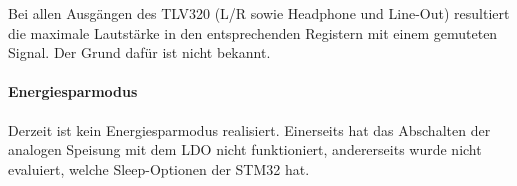 Bei allen Ausgängen des TLV320 (L/R sowie Headphone und Line-Out) resultiert die maximale Lautstärke in den entsprechenden Registern mit einem gemuteten Signal.
Der Grund dafür ist nicht bekannt.

\paragraph{Energiesparmodus}

Derzeit ist kein Energiesparmodus realisiert. Einerseits hat das Abschalten der analogen Speisung mit dem LDO nicht funktioniert, andererseits wurde nicht evaluiert, welche Sleep-Optionen der STM32 hat.




